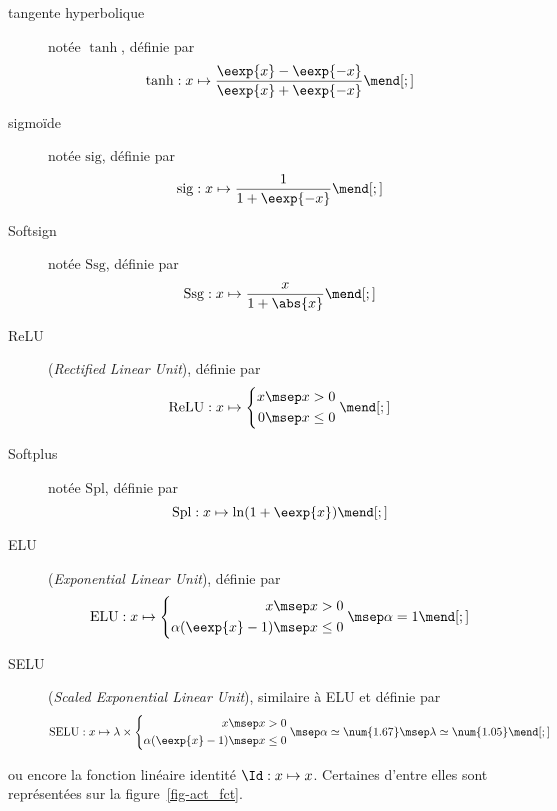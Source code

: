 \begin{description}
\item[tangente hyperbolique] notée $\tanh$, définie par
\begin{equation}
\tanh
:x\mapsto
\frac{\eexp{x}-\eexp{-x}}{\eexp{x}+\eexp{-x}}
\label{eq-act_fct-tanh}
\mend[;]
\end{equation}
\item[sigmoïde] notée $\mathrm{sig}$, définie par
\begin{equation}
\mathrm{sig}
:x\mapsto
\frac{1}{1+\eexp{-x}}
\label{eq-act_fct-sig}
\mend[;]
\end{equation}
\item[Softsign] notée $\mathrm{Ssg}$, définie par
\begin{equation}
\mathrm{Ssg}
:x\mapsto
\frac{x}{1+\abs{x}}
\label{eq-act_fct-ssg}
\mend[;]
\end{equation}
\item[ReLU] (\emph{Rectified Linear Unit}), définie par
\begin{equation}
\mathrm{ReLU}
:x\mapsto
\left\lbrace \begin{aligned}
x\msep & x > 0\\
0\msep & x \leq 0
\end{aligned} \right.
\label{eq-act_fct-relu}
\mend[;]
\end{equation}
\item[Softplus] notée $\mathrm{Spl}$, définie par
\begin{equation}
\mathrm{Spl}
:x\mapsto
\ln(1+\eexp{x})
\label{eq-act_fct-spl}
\mend[;]
\end{equation}
\item[ELU] (\emph{Exponential Linear Unit}), définie par
\begin{equation}
\mathrm{ELU}
:x\mapsto
\left\lbrace \begin{aligned}
x\msep & x > 0\\
\alpha(\eexp{x}-1)\msep & x \leq 0
\end{aligned} \right.
\msep
\alpha=1
\label{eq-act_fct-elu}
\mend[;]
\end{equation}
\item[SELU] (\emph{Scaled Exponential Linear Unit}), similaire à ELU et définie par
\begin{equation}
\mathrm{SELU}
:x\mapsto
\lambda\times\left\lbrace \begin{aligned}
x\msep & x > 0\\
\alpha(\eexp{x}-1)\msep & x \leq 0
\end{aligned} \right.
\msep
\alpha \simeq \num{1.67}
\msep
\lambda \simeq \num{1.05}
\label{eq-act_fct-selu}
\mend[;]
\end{equation}
\end{description}
ou encore la fonction linéaire identité $\Id:x\mapsto x$.
Certaines d'entre elles sont représentées sur la figure~\ref{fig-act_fct}.